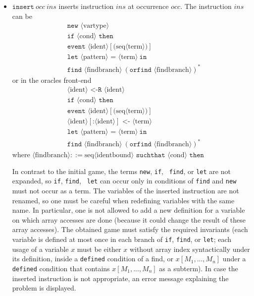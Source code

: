 \documentclass{article}
\newcommand{\nonterm}[1]{\langle\textrm{#1}\rangle}
\newcommand{\seq}[1]{\textrm{seq}\nonterm{#1}}
\begin{document}
\begin{itemize}
\item $\texttt{insert}\ occ\ ins$ inserts instruction $ins$ at
occurrence $occ$. The instruction $ins$ can be 
\begin{align*}
&\texttt{new\ }\nonterm{vartype}\\
&\texttt{if }\nonterm{cond}\texttt{ then}\\
&\texttt{event }\nonterm{ident}[\texttt{(}\seq{term}\texttt{)}]\\
&\texttt{let }\nonterm{pattern} \texttt{ = }\nonterm{term}\ \texttt{in}\\
&\texttt{find }\nonterm{findbranch}\ (\texttt{orfind }\nonterm{findbranch})^*
\end{align*}
or in the oracles front-end
\begin{align*}
&\nonterm{ident}\texttt{ <-R }\nonterm{ident}\\
&\texttt{if }\nonterm{cond}\texttt{ then}\\
&\texttt{event }\nonterm{ident}[\texttt{(}\seq{term}\texttt{)}]\\
&\nonterm{ident}[\texttt{:}\nonterm{ident}] \texttt{ <- }\nonterm{term}\\
&\texttt{let }\nonterm{pattern} \texttt{ = }\nonterm{term}\ \texttt{in}\\
&\texttt{find }\nonterm{findbranch}\ (\texttt{orfind }\nonterm{findbranch})^*
\end{align*}
where $\nonterm{findbranch} ::= \seq{identbound} \texttt{ suchthat }\nonterm{cond}\texttt{ then}$

In contrast to the initial game, the terms {\tt new}, {\tt if}, {\tt
  find}, or {\tt let} are not expanded, so {\tt if}, {\tt find}, {\tt
  let} can occur only in conditions of {\tt find} and {\tt new} must
not occur as a term.
%
The variables of the inserted instruction are not renamed, so one must
be careful when redefining variables with the same name. In
particular, one is not allowed to add a new definition for a variable
on which array accesses are done (because it could change the result
of these array accesses).
%
The obtained game must satisfy the required invariants (each variable
is defined at most once in each branch of {\tt if}, {\tt find}, or {\tt let};
each usage of a variable $x$ must be either $x$ without array index syntactically
under its definition, inside a {\tt defined} condition of a find, or
$x[M_1, ..., M_n]$ under a {\tt defined} condition that contains $x[M_1, ..., M_n]$ 
as a subterm). 
%
In case the inserted instruction is not appropriate, an error
message explaining the problem is displayed.


\end{itemize}
\end{document}
